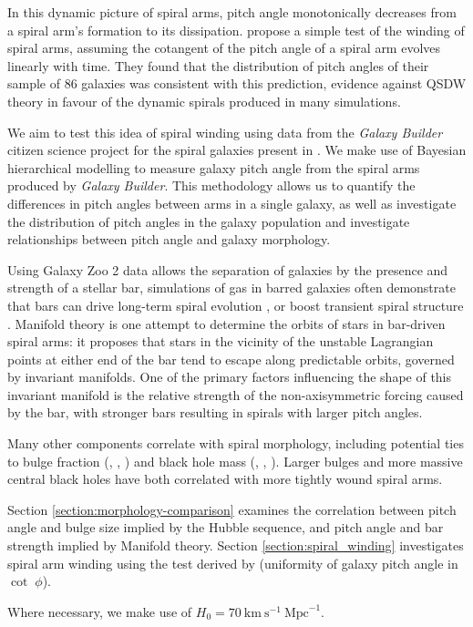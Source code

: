 In this dynamic picture of spiral arms, pitch angle monotonically decreases from a spiral arm's formation to its dissipation. \citet{2019arXiv190910291P} propose a simple test of the winding of spiral arms, assuming the cotangent of the pitch angle of a spiral arm evolves linearly with time. They found that the distribution of pitch angles of their sample of 86 galaxies was consistent with this prediction, evidence against QSDW theory in favour of the dynamic spirals produced in many simulations.

We aim to test this idea of spiral winding using data from the \textit{Galaxy Builder} citizen science project for the spiral galaxies present in \citet{2020arXiv200610450L}. We make use of Bayesian hierarchical modelling to measure galaxy pitch angle from the spiral arms produced by \textit{Galaxy Builder}. This methodology allows us to quantify the differences in pitch angles between arms in a single galaxy, as well as investigate the distribution of pitch angles in the galaxy population and investigate relationships between pitch angle and galaxy morphology.

Using Galaxy Zoo 2 data \citep{Willett2013:1308.3496v2} allows the separation of galaxies by the presence and strength of a stellar bar, simulations of gas in barred galaxies often demonstrate that bars can drive long-term spiral evolution \citep{2008A&A...489..115R}, or boost transient spiral structure \citep{2012MNRAS.426..167G}. Manifold theory \citealt{2006A&A...453...39R,2009MNRAS.394...67A,2009MNRAS.400.1706A} is one attempt to determine the orbits of stars in bar-driven spiral arms: it proposes that stars in the vicinity of the unstable Lagrangian points at either end of the bar tend to escape along predictable orbits, governed by invariant manifolds. One of the primary factors influencing the shape of this invariant manifold is the relative strength of the non-axisymmetric forcing caused by the bar, with stronger bars resulting in spirals with larger pitch angles.

Many other components correlate with spiral morphology, including potential ties to bulge fraction (\citealt{1975A&A....44..363Y}, \citealt{2013MNRAS.436.1074S}, \citealt{2019MNRAS.487.1808M}) and black hole mass (\citealt{2008ApJ...678L..93S}, \citealt{2017MNRAS.471.2187D}, \citealt{2019MS&E..571a2118A}). Larger bulges and more massive central black holes have both correlated with more tightly wound spiral arms.

Section \ref{section:morphology-comparison} examines the correlation between pitch angle and bulge size implied by the Hubble sequence, and pitch angle and bar strength implied by Manifold theory. Section \ref{section:spiral_winding} investigates spiral arm winding using the test derived by \cite{2019arXiv190910291P} (uniformity of galaxy pitch angle in $\cot\;\phi$).

Where necessary, we make use of $H_0 = 70\ \text{km}\ \text{s}^{-1}\ \text{Mpc}^{-1}$.
